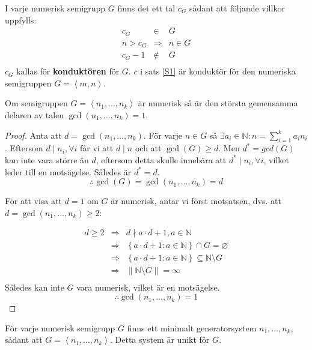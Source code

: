 \begin{Definition}
I varje numerisk semigrupp $G$ finns det ett tal $c_G$ sådant att följande villkor uppfylls:
\[\begin{array}{rcl}
c_G & \in & G \\
n > c_G & \Longrightarrow & n \in G \\
c_G - 1 & \notin & G \\
\end{array}\]
$c_G$ kallas för \textbf{konduktören} för $G$. $c$ i sats \ref{S1} är konduktör för den numeriska semigruppen $G = \left<m, n\right>$.
\end{Definition}

\begin{Theorem}
\label{S2}
Om semigruppen $G = \left<n_1, \ldots, n_k\right>$ är numerisk så är den största gemensamma delaren av talen $\gcd(n_1, \ldots, n_k) = 1$.
\end{Theorem}

\begin{proof}
Anta att $d=\gcd(n_1,\ldots,n_k)$. För varje $n \in G$ så $\exists a_i \in \mathbb{N} : n = \sum_{i=1}^{k} a_i n_i$. Eftersom $d \mid n_i, \forall i$ får vi att $d \mid n$ och att $\gcd(G) \geq d$. Men $d^* = gcd(G)$ kan inte vara större än $d$, eftersom detta skulle innebära att $d^* \mid n_i, \forall i$, vilket leder till en motsägelse. Således är $d^*=d$.
\[\therefore \gcd(G)=\gcd(n_1,\ldots,n_k)=d\] 

För att visa att $d=1$ om $G$ är numerisk, antar vi först motsatsen, dvs. att $d = \gcd(n_1, \ldots, n_k) \geq 2$:

\[\begin{array}{rcl}
d \geq 2 & \Longrightarrow & d \nmid a \cdot d + 1, a \in \mathbb{N} \\
 & \Longrightarrow & \left\{a \cdot d + 1 : a \in \mathbb{N}\right\} \cap G = \varnothing \\
 & \Longrightarrow & \left\{a \cdot d + 1 : a \in \mathbb{N}\right\} \subseteq \mathbb{N} \setminus G \\
 & \Longrightarrow & \left\|\mathbb{N} \setminus G \right\| = \infty \\
\end{array}\]
Således kan inte $G$ vara numerisk, vilket är en motsägelse.
\[\therefore \gcd(n_1, \ldots, n_k) = 1\]
\end{proof}

\begin{Theorem}
\label{S3}
För varje numerisk semigrupp $G$ finns ett minimalt generatorsystem $n_1, \ldots, n_k$, sådant att $G = \left<n_1, \ldots, n_k\right>$. Detta system är unikt för $G$.
\end{Theorem}

